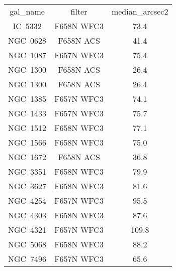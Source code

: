 \begin{table}
\begin{tabular}{ccc}
gal_name & filter & median_arcsec2 \\
IC~5332 & F658N WFC3 & 73.4 \\
NGC~0628 & F658N ACS & 41.4 \\
NGC~1087 & F657N WFC3 & 75.4 \\
NGC~1300 & F658N ACS & 26.4 \\
NGC~1300 & F658N ACS & 26.4 \\
NGC~1385 & F657N WFC3 & 74.1 \\
NGC~1433 & F657N WFC3 & 75.7 \\
NGC~1512 & F658N WFC3 & 77.1 \\
NGC~1566 & F658N WFC3 & 75.0 \\
NGC~1672 & F658N ACS & 36.8 \\
NGC~3351 & F658N WFC3 & 79.9 \\
NGC~3627 & F658N WFC3 & 81.6 \\
NGC~4254 & F657N WFC3 & 95.5 \\
NGC~4303 & F658N WFC3 & 87.6 \\
NGC~4321 & F657N WFC3 & 109.8 \\
NGC~5068 & F658N WFC3 & 88.2 \\
NGC~7496 & F657N WFC3 & 65.6 \\
\end{tabular}
\end{table}
